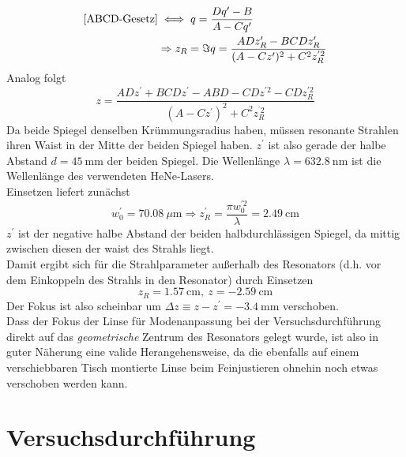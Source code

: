 \documentclass[11pt,a4paper,oneside]{scrartcl}
\begin{document}
\begin{align}
\ref{ABCD-Gesetz}& \iff q = \frac{Dq^\prime-B}{A-Cq^\prime}\\ & \Rightarrow z_R=\Im{q}%
=\frac{ADz_R^\prime-BCDz_R^\prime}{(A-Cz^\prime)^2+C^2z_R^{^\prime 2}}
\end{align}
Analog folgt 
\begin{equation}
z=\frac{ADz^\prime+BCDz^\prime-ABD-CDz^{\prime 2}-CDz_R^{\prime 2}}{(A-Cz^\prime)^2+C^2z_R^{^\prime 2}}
\end{equation}
Da beide Spiegel denselben Krümmungsradius haben, müssen resonante Strahlen ihren Waist in der Mitte der beiden Spiegel haben. $z^\prime$ ist also gerade der halbe Abstand $d=45\ \mathrm{mm}$ der beiden Spiegel. Die Wellenlänge $\lambda=632.8\ \mathrm{nm}$ ist die Wellenlänge des verwendeten HeNe-Lasers. \\
Einsetzen liefert zunächst
\begin{equation}
w_0^\prime = 70.08\ \mu\mathrm m\Rightarrow z_R^\prime = \frac{\pi w_0^{\prime 2}}{\lambda} = 2.49\ \mathrm{cm}
\end{equation}
 $z^\prime$ ist der negative halbe Abstand der beiden halbdurchlässigen Spiegel, da mittig zwischen diesen der waist des Strahls liegt. \\
Damit ergibt sich für die Strahlparameter außerhalb des Resonators (d.h. vor dem Einkoppeln des Strahls in den Resonator) durch Einsetzen
\begin{equation}
z_R = 1.57\ \mathrm{cm},\ z = -2.59\ \mathrm{cm}
\end{equation}
Der Fokus ist also scheinbar um $\Delta z\equiv z-z^\prime = -3.4\ \mathrm{mm}$ verschoben. \\
Dass der Fokus der Linse für Modenanpassung bei der Versuchsdurchführung direkt auf das \emph{geometrische} Zentrum des Resonators gelegt wurde, ist also in guter Näherung eine valide Herangehensweise, da die ebenfalls auf einem verschiebbaren Tisch montierte Linse beim Feinjustieren ohnehin noch etwas verschoben werden kann.
\section{Versuchsdurchführung}
\end{document}
